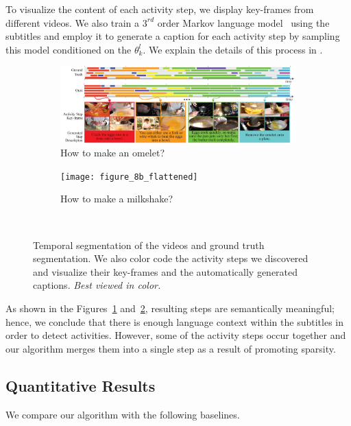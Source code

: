 To visualize the content of each activity step, we display key-frames from different videos. We also train a $3^{rd}$ order Markov language model~\cite{languageModel} using the subtitles and employ it to generate a caption for each activity step by sampling this model conditioned on the $\theta^l_k$. We explain the details of this process in \cite{supp}.

\begin{figure}[ht]
  \begin{subfigure}[b]{\textwidth}
    \includegraphics[width=\textwidth]{figure_8a_flattened}
    \vspace{-5mm}
    \caption{How to make an omelet?}
    \vspace{-1mm}
    \label{recipe:ommelette}
  \end{subfigure}

  \begin{subfigure}[b]{\textwidth}
    \texttt{[image: figure\_8b\_flattened]}
    \caption{How to make a milkshake?}
    \vspace{-3mm}
    \label{recipe:milkshake}
  \end{subfigure}~
\caption{Temporal segmentation of the videos and ground truth segmentation. We also color code the activity steps we discovered and visualize their key-frames and the automatically generated captions. \emph{Best viewed in color.}}
\label{recipe:overall}
\vspace{-3mm}
\end{figure}

As shown in the Figures~\ref{recipe:ommelette} and~\ref{recipe:milkshake}, resulting steps are semantically meaningful; hence, we conclude that there is enough language context within the subtitles in order to detect activities. However, some of the activity steps occur together and our algorithm merges them into a single step as a result of promoting sparsity.

\subsection{Quantitative Results}
We compare our algorithm with the following baselines.

